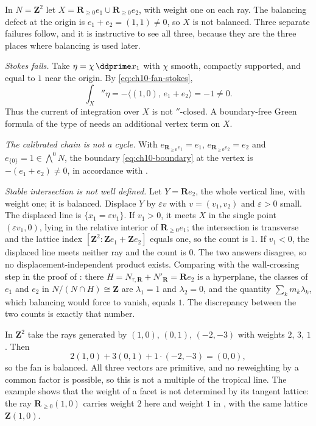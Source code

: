 \begin{example}
\label{ex:ch10-unbalanced}
In $N=\mathbf Z^2$ let $X=\mathbf R_{\geq0}e_1\cup\mathbf R_{\geq0}e_2$, with
weight one on each ray.  The balancing defect at the origin is
$e_1+e_2=(1,1)\neq0$, so $X$ is not balanced.  Three separate failures
follow, and it is instructive to see all three, because they are the three
places where balancing is used later.

\emph{Stokes fails.}  Take $\eta=\chi\,\ddprime x_1$ with $\chi$ smooth,
compactly supported, and equal to $1$ near the origin.  By
\eqref{eq:ch10-fan-stokes},
\[
 \int_X\dprime\eta
 =-\langle(1,0),\,e_1+e_2\rangle=-1\neq0 .
\]
Thus the current of integration over $X$ is not $\dprime$-closed. A
boundary-free Green formula of the type of
 needs an additional vertex term
on $X$.

\emph{The calibrated chain is not a cycle.}  With
$e_{\mathbf R_{\geq0}e_1}=e_1$, $e_{\mathbf R_{\geq0}e_2}=e_2$ and
$e_{\{0\}}=1\in\bigwedge^0N$, the boundary
\eqref{eq:ch10-boundary} at the vertex is $-(e_1+e_2)\neq0$, in accordance
with .

\emph{Stable intersection is not well defined.}  Let $Y=\mathbf Re_2$, the
whole vertical line, with weight one; it is balanced.  Displace $Y$ by
$\varepsilon v$ with $v=(v_1,v_2)$ and $\varepsilon>0$ small.  The displaced
line is $\{x_1=\varepsilon v_1\}$.  If $v_1>0$, it meets $X$ in the single
point $(\varepsilon v_1,0)$, lying in the relative interior of
$\mathbf R_{\geq0}e_1$; the intersection is transverse and the lattice index
$[\mathbf Z^2:\mathbf Ze_1+\mathbf Ze_2]$ equals one, so the count is $1$.
If $v_1<0$, the displaced line meets neither ray and the count is $0$.  The
two answers disagree, so no displacement-independent product exists.
Comparing with the wall-crossing step in the proof of
: there $H=N_{\tau,\mathbf R}+
N'_{\mathbf R}=\mathbf Re_2$ is a hyperplane, the classes of $e_1$ and $e_2$
in $N/(N\cap H)\cong\mathbf Z$ are $\lambda_1=1$ and $\lambda_2=0$, and the
quantity $\sum_k m_k\lambda_k$, which balancing would force to vanish, equals
$1$.  The discrepancy between the two counts is exactly that number.
\end{example}

\begin{example}
\label{ex:ch10-weights-234}
In $\mathbf Z^2$ take the rays generated by $(1,0)$, $(0,1)$, $(-2,-3)$ with
weights $2$, $3$, $1$.  Then
\[
 2(1,0)+3(0,1)+1\cdot(-2,-3)=(0,0),
\]
so the fan is balanced.  All three vectors are primitive, and no reweighting
by a common factor is possible, so this is not a multiple of the tropical
line.  The example shows that the weight of a facet is not determined by its
tangent lattice: the ray $\mathbf R_{\geq0}(1,0)$ carries weight $2$ here and
weight $1$ in , with the same lattice
$\mathbf Z(1,0)$.
\end{example}

